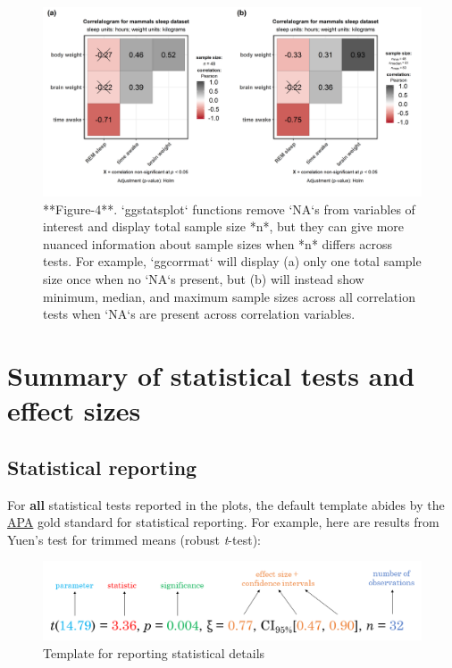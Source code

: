 \documentclass[]{article}
\begin{document}
\begin{figure}
\includegraphics[width=1\linewidth]{./figures/paper-example4-1} \caption{**Figure-4**. `ggstatsplot` functions remove `NA`s from variables of interest and display total sample size *n*, but they can give more nuanced information about sample sizes when *n* differs across tests. For example, `ggcorrmat` will display (a) only one total sample size once when no `NA`s present, but (b) will instead show minimum, median, and maximum sample sizes across all correlation tests when `NA`s are present across correlation variables.}\label{fig:example4}
\end{figure}

\hypertarget{summary-of-statistical-tests-and-effect-sizes}{%
\section{Summary of statistical tests and effect
sizes}\label{summary-of-statistical-tests-and-effect-sizes}}

\hypertarget{statistical-reporting}{%
\subsection{Statistical reporting}\label{statistical-reporting}}

For \textbf{all} statistical tests reported in the plots, the default
template abides by the
\href{https://my.ilstu.edu/~jhkahn/apastats.html}{APA} gold standard for
statistical reporting. For example, here are results from Yuen's test
for trimmed means (robust \emph{t}-test):

\begin{figure}
\centering
\includegraphics{figures/stats_reporting_format.png}
\caption{Template for reporting statistical details}
\end{figure}
\end{document}
